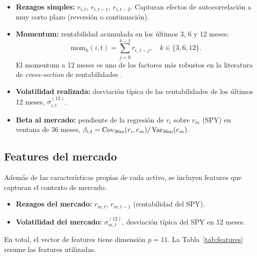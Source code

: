 \begin{itemize}
    \item \textbf{Rezagos simples:} $r_{i,t}$, $r_{i,t-1}$, $r_{i,t-2}$.
          Capturan efectos de autocorrelación a muy corto plazo (reversión
          o continuación).
    \item \textbf{Momentum:} rentabilidad acumulada en los últimos 3, 6 y 12
          meses:
          \begin{equation}
              \text{mom}_{k}(i,t) = \sum_{j=0}^{k-1} r_{i,\,t-j},
              \quad k \in \{3, 6, 12\}.
              \label{eq:momentum}
          \end{equation}
          El momentum a 12 meses es uno de los factores más robustos en la
          literatura de \textit{cross-section} de rentabilidades
          \cite{Jegadeesh1993}.
    \item \textbf{Volatilidad realizada:} desviación típica de las
          rentabilidades de los últimos 12 meses, $\sigma_{i,t}^{(12)}$.
    \item \textbf{Beta al mercado:} pendiente de la regresión de $r_i$ sobre
          $r_m$ (SPY) en ventana de 36 meses,
          $\beta_{i,t} = \mathop{\textnormal{Cov}}\nolimits_{36\text{m}}(r_i, r_m)/\mathop{\textnormal{Var}}\nolimits_{36\text{m}}(r_m)$.
\end{itemize}

\subsection{Features del mercado}

Además de las características propias de cada activo, se incluyen features
que capturan el contexto de mercado:
\begin{itemize}
    \item \textbf{Rezagos del mercado:} $r_{m,t}$, $r_{m,t-1}$ (rentabilidad
          del SPY).
    \item \textbf{Volatilidad del mercado:} $\sigma_{m,t}^{(12)}$, desviación
          típica del SPY en 12 meses.
\end{itemize}

En total, el vector de features tiene dimensión $p = 11$. La
Tabla~\ref{tab:features} resume las features utilizadas.

